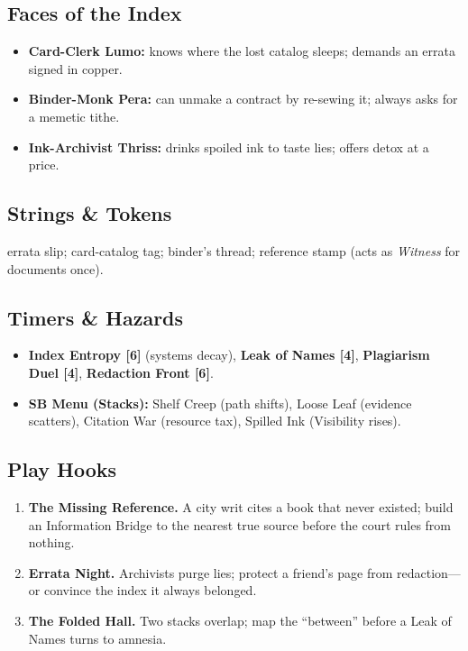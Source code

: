 \documentclass[11pt]{book}
\begin{document}
\subsection*{Faces of the Index}
\begin{itemize}
    \item \textbf{Card-Clerk Lumo:} knows where the lost catalog sleeps; demands an errata signed in copper.
    \item \textbf{Binder-Monk Pera:} can unmake a contract by re-sewing it; always asks for a memetic tithe.
    \item \textbf{Ink-Archivist Thriss:} drinks spoiled ink to taste lies; offers detox at a price.
\end{itemize}

\subsection*{Strings \& Tokens}
errata slip; card-catalog tag; binder's thread; reference stamp (acts as \emph{Witness} for documents once).

\subsection*{Timers \& Hazards}
\begin{itemize}
    \item \textbf{Index Entropy [6]} (systems decay), \textbf{Leak of Names [4]}, \textbf{Plagiarism Duel [4]}, \textbf{Redaction Front [6]}.
    \item \textbf{SB Menu (Stacks):} Shelf Creep (path shifts), Loose Leaf (evidence scatters), Citation War (resource tax), Spilled Ink (Visibility rises).
\end{itemize}

\subsection*{Play Hooks}
\begin{enumerate}
    \item \textbf{The Missing Reference.} A city writ cites a book that never existed; build an Information Bridge to the nearest true source before the court rules from nothing.
    \item \textbf{Errata Night.} Archivists purge lies; protect a friend's page from redaction---or convince the index it always belonged.
    \item \textbf{The Folded Hall.} Two stacks overlap; map the ``between'' before a Leak of Names turns to amnesia.
\end{enumerate}
\end{document}
